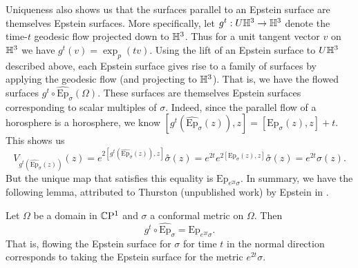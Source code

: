 Uniqueness also shows us that the surfaces parallel to an Epstein surface are themselves Epstein surfaces. 
More specifically, let $g^t : U \mathbb{H}^3 \to \mathbb{H}^3$ denote the time-$t$ geodesic flow projected down to $\mathbb{H}^3$.
Thus for a unit tangent vector $v$ on $\mathbb{H}^3$ we have $g^t(v) = \exp_p(tv)$.
Using the lift of an Epstein surface to $U\mathbb{H}^3$ described above, each Epstein surface gives rise to a family of surfaces by applying the geodesic flow (and projecting to $\mathbb{H}^3$). 
That is, we have the flowed surfaces $g^t \circ \widehat{\mathrm{Ep}}_\sigma(\Omega)$. 
These surfaces are themselves Epstein surfaces corresponding to scalar multiples of $\sigma$. 
Indeed, since the parallel flow of a horosphere is a horosphere, we know $[g^t(\widehat{\mathrm{Ep}}_\sigma(z)),z] = [\mathrm{Ep}_\sigma(z),z] + t$. 
This shows us
\[
V_{g^t(\widehat{\mathrm{Ep}}_\sigma(z))}(z) = e^{2[g^t(\widehat{\mathrm{Ep}}_\sigma(z)),z]}\overset{\circ}{\sigma}(z) = e^{2t}e^{2[\mathrm{Ep}_\sigma(z),z]}\overset{\circ}{\sigma}(z) = e^{2t}\sigma(z).
\]
But the unique map that satisfies this equality is $\mathrm{Ep}_{e^{2t}\sigma}$. 
In summary, we have the following lemma, attributed to Thurston (unpublished work) by Epstein in \cite{epstein1984}.
\begin{lem}
\label{epstein-flow}
Let $\Omega$ be a domain in $\mathbb{C}\mathrm{P}^1$ and $\sigma$ a conformal metric on $\Omega$.
Then 
\[
g^t \circ \widehat{\mathrm{Ep}}_\sigma  = \mathrm{Ep}_{e^{2t} \sigma}.
\]
That is, flowing the Epstein surface for $\sigma$ for time $t$ in the normal direction corresponds to taking the Epstein surface for the metric $e^{2t}\sigma$.
\end{lem}
